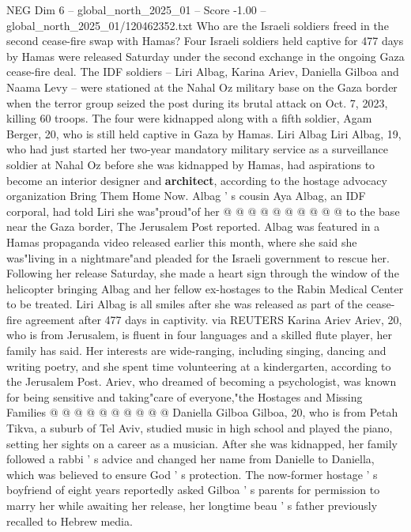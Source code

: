 \begin{textsample}{NEG Dim 6 – global\_north\_2025\_01 – Score -1.00 – global\_north\_2025\_01/120462352.txt}  \label{ex:f6_neg_102}
Who are the Israeli soldiers freed in the second cease-fire swap with Hamas?
Four Israeli soldiers held captive for 477 days by Hamas were released Saturday under the second exchange in the ongoing Gaza cease-fire deal.
The IDF soldiers -- Liri Albag, Karina Ariev, Daniella Gilboa and Naama Levy -- were stationed at the Nahal Oz military base on the Gaza border when the terror group seized the post during its brutal attack on Oct. 7, 2023, killing 60 troops.
The four were kidnapped along with a fifth soldier, Agam Berger, 20, who is still held captive in Gaza by Hamas.
Liri Albag Liri Albag, 19, who had just started her two-year mandatory military service as a surveillance soldier at Nahal Oz before she was kidnapped by Hamas, had aspirations to become an interior designer and \textbf{architect}, according to the hostage advocacy organization Bring Them Home Now.
Albag ' s cousin Aya Albag, an IDF corporal, had told Liri she was"proud"of her @ @ @ @ @ @ @ @ @ @ to the base near the Gaza border, The Jerusalem Post reported.
Albag was featured in a Hamas propaganda video released earlier this month, where she said she was"living in a nightmare"and pleaded for the Israeli government to rescue her.
Following her release Saturday, she made a heart sign through the window of the helicopter bringing Albag and her fellow ex-hostages to the Rabin Medical Center to be treated.
Liri Albag is all smiles after she was released as part of the cease-fire agreement after 477 days in captivity. via REUTERS Karina Ariev Ariev, 20, who is from Jerusalem, is fluent in four languages and a skilled flute player, her family has said.
Her interests are wide-ranging, including singing, dancing and writing poetry, and she spent time volunteering at a kindergarten, according to the Jerusalem Post.
Ariev, who dreamed of becoming a psychologist, was known for being sensitive and taking"care of everyone,"the Hostages and Missing Families @ @ @ @ @ @ @ @ @ @ Daniella Gilboa Gilboa, 20, who is from Petah Tikva, a suburb of Tel Aviv, studied music in high school and played the piano, setting her sights on a career as a musician.
After she was kidnapped, her family followed a rabbi ' s advice and changed her name from Danielle to Daniella, which was believed to ensure God ' s protection.
The now-former hostage ' s boyfriend of eight years reportedly asked Gilboa ' s parents for permission to marry her while awaiting her release, her longtime beau ' s father previously recalled to Hebrew media.

\end{textsample}
